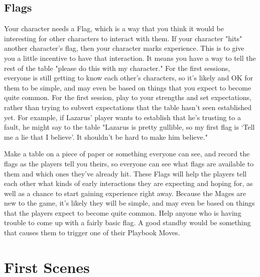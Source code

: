 \documentclass[
  oneside,
  statementpaper,
  9pt]{memoir}
\begin{document}
\hypertarget{flags}{%
\subsection{Flags}\label{flags}}

\begin{Player}

Your character needs a Flag, which is a way that you think it would be interesting for other characters to interact with them. If your character "hits" another character's flag, then your character marks experience. This is to give you a little incentive to have that interaction. It means you have a way to tell the rest of the table "please do this with my character." For the first sessions, everyone is still getting to know each other's characters, so it's likely and OK for them to be simple, and may even be based on things that you expect to become quite common. For the first session, play to your strengths and set expectations, rather than trying to subvert expectations that the table hasn’t seen established yet. For example, if Lazarus’ player wants to establish that he’s trusting to a fault, he might say to the table "Lazarus is pretty gullible, so my first flag is ‘Tell me a lie that I believe’. It shouldn’t be hard to make him believe."

\end{Player}

\begin{MC}

Make a table on a piece of paper or something everyone can see, and record the flags as the players tell you theirs, so everyone can see what flags are available to them and which ones they've already hit. These Flags will help the players tell each other what kinds of early interactions they are expecting and hoping for, as well as a chance to start gaining experience right away. Because the Mages are new to the game, it’s likely they will be simple, and may even be based on things that the players expect to become quite common. Help anyone who is having trouble to come up with a fairly basic flag. A good standby would be something that causes them to trigger one of their Playbook Moves.

\end{MC}

\hypertarget{first-scenes}{%
\section{First Scenes}\label{first-scenes}}
\end{document}
